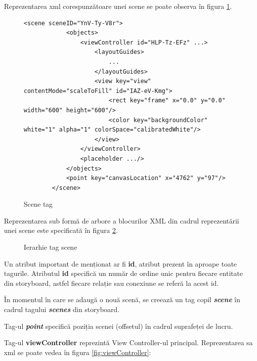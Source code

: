 Reprezentarea xml corespunzătoare unei scene se poate observa în figura \ref{fig:scene}.

\begin{figure}[!htbp]
\lstset{language=XML}
\begin{lstlisting}
<scene sceneID="YnV-Ty-V8r">
            <objects>
                <viewController id="HLP-Tz-EFz" ...>
                    <layoutGuides>
                        ...
                    </layoutGuides>
                    <view key="view" contentMode="scaleToFill" id="IAZ-eV-Kmg">
                        <rect key="frame" x="0.0" y="0.0" width="600" height="600"/>
                        <color key="backgroundColor" white="1" alpha="1" colorSpace="calibratedWhite"/>
                    </view>
                </viewController>
                <placeholder .../>
            </objects>
            <point key="canvasLocation" x="4762" y="97"/>
        </scene>
\end{lstlisting}
\caption{Scene tag}\label{fig:scene}
\end{figure}

Reprezentarea sub formă de arbore a blocurilor XML din cadrul reprezentării unei scene este specificată în figura \ref{fig:sceneIerarhie}.

\begin{figure}[!htbp]
\caption{Ierarhie tag scene}\label{fig:sceneIerarhie}
\end{figure}

Un atribut important de menționat ar fi \textbf{id}, atribut prezent în aproape toate tagurile. Atributul \textbf{id} specifică un număr de ordine unic pentru fiecare entitate din storyboard, astfel fiecare relație sau conexiune se referă la acest id.

În momentul în care se adaugă o nouă scenă, se creează un tag copil \textbf{\textit{scene}} în cadrul tagului \textbf{\textit{scenes}} din storyboard. 

Tag-ul \textbf{\textit{point}} specifică poziția scenei (offsetul) în cadrul suprafeței de lucru.

Tag-ul \textbf{viewController} reprezintă View Controller-ul principal. Reprezentarea sa xml se poate vedea în figura \ref{fig:viewController}:


